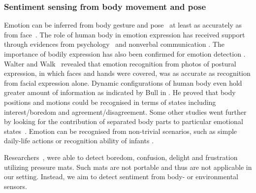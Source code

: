 \documentclass[12pt]{article}
\begin{document}
\subsubsection*{Sentiment sensing from body movement and pose}
Emotion can be inferred from body gesture and pose~\cite{Pervasive_Jaggarwal_2012} at least as accurately as from face~\cite{Emotion_Nguyen_2012,Emotion_Castellano_2008,Emotion_Meeren_2005}.
The role of human body in emotion expression has received support through evidences from psychology~\cite{Emotion_Walters_1986} and nonverbal communication \cite{Emotion_Dittmann_1978}. 
The importance of  bodily expression has also been confirmed for emotion detection \cite{Emotion_Wallbott_1998, Emotion_VanHeijnsbergen_2007,Emotion_Atkinson_2007}. 
Walter and Walk~\cite{Emotion_Walters_1986} revealed that emotion recognition from photos of postural expression, in which faces and hands were covered, was as accurate as recognition from facial expression alone.
Dynamic configurations of human body even hold greater amount of information as indicated by Bull in \cite{Emotion_Bull_1987}. 
He proved that body positions and motions could be recognised in terms of states including interest/boredom and agreement/disagreement. 
Some other studies went further by looking for the contribution of separated body parts to particular emotional states~\cite{Emotion_DeMeijer_1989,Emotion_Montepare_1999}.
Emotion can be recognised from non-trivial scenarios, such as simple daily-life actions \cite{Emotion_Crane_2007,Emotion_Bernhardt_2007} or recognition ability of infants \cite{Emotion_Lagerlof_2009}. 


 Researchers~\cite{SentimentSensing_Mota_2003,SentimentSesing_Mello_2009}, were able to detect boredom, confusion, delight and frustration utilizing pressure mats. 
Such mats are not portable and thus are not applicable in our setting. 
Instead, we aim to detect sentiment from body- or environmental sensors. 
\end{document}
